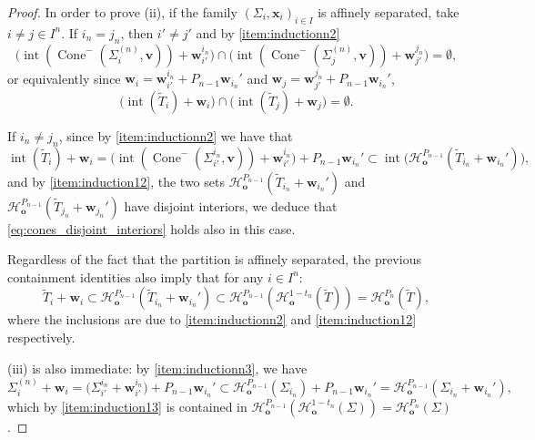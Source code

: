 \documentclass[10pt]{amsart}
\newcommand{\ocone}[2]{\operatorname{Cone}^-(#1,#2)}
\begin{document}
\begin{proof}
In order to prove (ii), if the family $(\Sigma_i,\mathbf{x}_i)_{i \in I}$ is affinely separated, take $i\neq j\in I^n$. If $i_n=j_n$, then $i'\neq j'$ and by \ref{item:inductionn2} 
\begin{equation*}
   \Big( \operatorname{int}(\ocone{\Sigma_i^{(n)}}{ \mathbf{v})}+\mathbf{w}_{i'}^{i_n}\Big)\cap \Big( \operatorname{int}(\ocone{\Sigma_j^{(n)}}{ \mathbf{v})}+\mathbf{w}_{j'}^{j_n}\Big)=\emptyset,
\end{equation*}
or equivalently since $\mathbf{w}_i = \mathbf{w}_{i'}^{i_n} + P_{n-1} \mathbf{w}_{i_n}'$ and $\mathbf{w}_j = \mathbf{w}_{j'}^{j_n} + P_{n-1} \mathbf{w}_{i_n}'$,
\begin{equation}\label{eq:cones_disjoint_interiors}
    \Big( \operatorname{int}(\widetilde{T}_i)+\mathbf{w}_{i}\Big)\cap \Big( \operatorname{int}(\widetilde{T}_j)+\mathbf{w}_{j}\Big)=\emptyset .
\end{equation}

If $i_n\neq j_n$, since by \ref{item:inductionn2} we have that
\begin{equation*}
    \operatorname{int}(\widetilde{T}_i)+\mathbf{w}_{i} = \Big( \operatorname{int}(\ocone{\Sigma_{i'}^{i_n}}{ \mathbf{v})}+\mathbf{w}_{i'}^{i_n}\Big)+P_{n-1}\mathbf{w}_{i_n}'
   \subset \operatorname{int}\Big(\mathcal{H}^{P_{n-1}}_\mathbf{o}(\widetilde{T}_{i_n}+\mathbf{w}_{i_n}')\Big),
\end{equation*}
and by \ref{item:induction12}, the two sets $\mathcal{H}^{P_{n-1}}_\mathbf{o}(\widetilde{T}_{i_n}+\mathbf{w}_{i_n}')$ and $\mathcal{H}^{P_{n-1}}_\mathbf{o}(\widetilde{T}_{j_n}+\mathbf{w}_{j_n}')$ have disjoint interiors, we deduce that \eqref{eq:cones_disjoint_interiors} holds also in this case.

Regardless of the fact that the partition is affinely separated, the previous containment identities also imply that for any $i\in I^n$:
\begin{equation*}
   \widetilde{T}_i+\mathbf{w}_{i} \subset \mathcal{H}^{P_{n-1}}_\mathbf{o}(\widetilde{T}_{i_n}+\mathbf{w}_{i_n}')\subset \mathcal{H}^{P_{n-1}}_\mathbf{o}( \mathcal{H}^{1-t_n}_\mathbf{o}(\widetilde T)) =  \mathcal{H}^{P_n}_\mathbf{o}(\widetilde{T}),
\end{equation*}
where the inclusions are due to \ref{item:inductionn2} and \ref{item:induction12} respectively.

(iii) is also immediate: by \ref{item:inductionn3}, we have
\begin{equation*}
    \Sigma_i^{(n)}+\mathbf{w}_i=\big(\Sigma_{i'}^{i_n}+\mathbf{w}_{i'}^{i_n}\big)+P_{n-1}\mathbf{w}_{i_n}'\subset \mathcal{H}^{P_{n-1}}_\mathbf{o}(\Sigma_{i_n})+P_{n-1}\mathbf{w}_{i_n}'=\mathcal{H}^{P_{n-1}}_\mathbf{o}(\Sigma_{i_n} + \mathbf{w}_{i_n}'),
\end{equation*}
which by \ref{item:induction13} is contained in $\mathcal{H}^{P_{n-1}}_\mathbf{o}(\mathcal{H}^{1-t_n}_\mathbf{o}(\Sigma))=\mathcal{H}^{P_n}_\mathbf{o}(\Sigma)$.
\end{proof}
\end{document}
